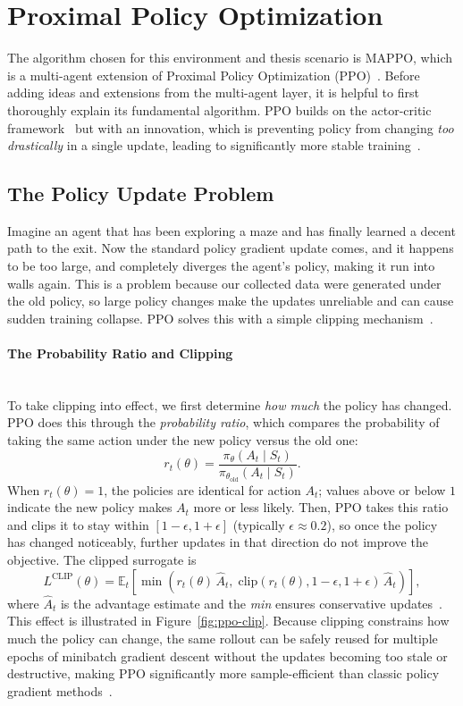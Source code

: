\section{Proximal Policy Optimization}
\label{sec:ppo}
The algorithm chosen for this environment and thesis scenario is MAPPO, which is a multi-agent extension of Proximal Policy Optimization (PPO)~\cite{yu2021mappo}. Before adding ideas and extensions from the multi-agent layer, it is helpful to first thoroughly explain its fundamental algorithm. PPO builds on the actor-critic framework~\cite{konda2000} but with an innovation, which is preventing policy from changing \emph{too drastically} in a single update, leading to significantly more stable training~\cite{schulman2017ppo}.

\subsection{The Policy Update Problem}
Imagine an agent that has been exploring a maze and has finally learned a decent path to the exit. Now the standard policy gradient update comes, and it happens to be too large, and completely diverges the agent's policy, making it run into walls again. This is a problem because our collected data were generated under the old policy, so large policy changes make the updates unreliable and can cause sudden training collapse. PPO solves this with a simple clipping mechanism~\cite{schulman2017ppo}.

\paragraph{The Probability Ratio and Clipping}\mbox{}\\
To take clipping into effect, we first determine \emph{how much} the policy has changed. PPO does this through the \emph{probability ratio}, which compares the probability of taking the same action under the new policy versus the old one:
\[
r_t(\theta)
= \frac{\pi_\theta(A_t \mid S_t)}{\pi_{\theta_{\text{old}}}(A_t \mid S_t)}.
\]
When $r_t(\theta) = 1$, the policies are identical for action $A_t$; values above or below $1$ indicate the new policy makes $A_t$ more or less likely. Then, PPO takes this ratio and clips it to stay within $[1-\epsilon, 1+\epsilon]$ (typically $\epsilon \approx 0.2$), so once the policy has changed noticeably, further updates in that direction do not improve the objective. The clipped surrogate is
\[
L^{\text{CLIP}}(\theta)
= \mathbb{E}_t\!\left[
\min\!\left(
r_t(\theta)\,\hat{A}_t,\;
\text{clip}(r_t(\theta), 1-\epsilon, 1+\epsilon)\,\hat{A}_t
\right)\right],
\]
where $\hat{A}_t$ is the advantage estimate and the \emph{min} ensures conservative updates~\cite{schulman2017ppo}. This effect is illustrated in Figure~\ref{fig:ppo-clip}. Because clipping constrains how much the policy can change, the same rollout can be safely reused for multiple epochs of minibatch gradient descent without the updates becoming too stale or destructive, making PPO significantly more sample-efficient than classic policy gradient methods~\cite{spinningup2018}.

